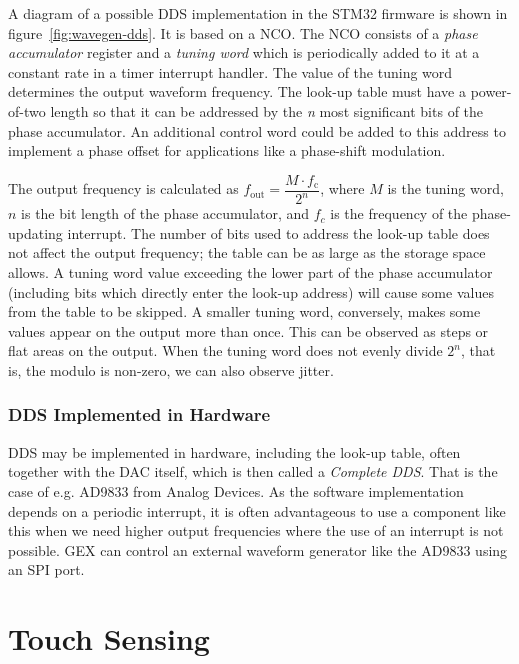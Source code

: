 A diagram of a possible \gls{DDS} implementation in the STM32 firmware is shown in figure~\ref{fig:wavegen-dds}. It is based on a \gls{NCO}. The \gls{NCO} consists of a \textit{phase accumulator} register and a \textit{tuning word} which is periodically added to it at a constant rate in a timer interrupt handler. The value of the tuning word determines the output waveform frequency. The look-up table must have a power-of-two length so that it can be addressed by the \textit{n} most significant bits of the phase accumulator. An additional control word could be added to this address to implement a phase offset for applications like a phase-shift modulation.

The output frequency is calculated as \(f_\mathrm{out} = \dfrac{M\cdot f_\mathrm{c}}{2^n}\), where $M$ is the tuning word, $n$ is the bit length of the phase accumulator, and $f_c$ is the frequency of the phase-updating interrupt. The number of bits used to address the look-up table does not affect the output frequency; the table can be as large as the storage space allows. A tuning word value exceeding the lower part of the phase accumulator (including bits which directly enter the look-up address) will cause some values from the table to be skipped. A smaller tuning word, conversely, makes some values appear on the output more than once. This can be observed as steps or flat areas on the output. When the tuning word does not evenly divide $2^n$, that is, the modulo is non-zero, we can also observe jitter.

\subsubsection{DDS Implemented in Hardware}

DDS may be implemented in hardware, including the look-up table, often together with the \gls{DAC} itself, which is then called a \textit{Complete \gls{DDS}}. That is the case of e.g. AD9833 from Analog Devices. As the software implementation depends on a periodic interrupt, it is often advantageous to use a component like this when we need higher output frequencies where the use of an interrupt is not possible. GEX can control an external waveform generator like the AD9833 using an \gls{SPI} port.

\section{Touch Sensing} \label{sec:theory-touch}

